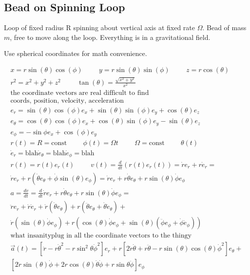 \documentclass[fleqn]{report}
\newcommand{\hp}{\hspace{1cm}}
\newcommand{\equations} [1] {
\begin{gather*}
#1
\end{gather*}
}
\begin{document}
\subsection{Bead on Spinning Loop}
Loop of fixed radius R spinning about vertical axis at fixed rate 
$\Omega$. Bead of mass $m$, free to move along the loop. Everything 
is in a gravitational field. 

Use spherical coordinates for math convenience. 

\equations{
    x = r\sin(\theta) \cos(\phi)
    \hp
    y = r\sin(\theta) \sin(\phi)
    \hp 
    z = r \cos(\theta)
    \\
    r^2 = x^2 + y^2 + z^2
    \hp 
    \tan(\theta) = \frac{\sqrt{x^2 + y^2}}{x^2}
    \\
    \textrm{the coordinate vectors are real difficult to find}
    \\
    \textrm{coords, position, velocity, acceleration}
    \\
    e_r = \sin(\theta) \cos(\phi) e_x + 
    \sin(\theta) \sin(\phi) e_y + 
    \cos(\theta) e_z
    \\
    e_\theta = \cos(\theta) \cos(\phi) e_x + 
    \cos(\theta) \sin(\phi) e_y -
    \sin(\theta) e_z
    \\
    e_\phi = - \sin \phi e_x + \cos(\phi) e_y
    \\
    r(t) = R = \textrm{const}
    \hp \phi(t) = \Omega t \hp \Omega = \textrm{const}
    \hp
    \theta(t)
    \\
    \dot e_r = \textrm{blah}
    \dot e_\theta = \textrm{blah}
    \dot e_\phi = \textrm{blah}
    \\
    r(t) = r(t) e_r(t)
    \hp v(t) = \frac{d}{dt} \left( r(t) e_r(t) \right)
    =
    \dot r e_r + r \dot e_r 
    =
    \\
    \dot r e_r + r \left( 
    \dot \theta e_\theta + \dot \phi \sin(\theta) e_\phi
    \right)
    =
    \dot r e_r + r \dot \theta e_\theta + 
    r \sin(\theta) \dot \phi e_\phi
    \\
    a = \frac{dv}{dt} = \frac{d}{dt}
    \dot r e_r + r \dot \theta e_\theta + 
    r \sin(\theta) \dot \phi e_\phi
    =
    \\
    \ddot r e_r + \dot r \dot e_r + 
    \dot r (\dot \theta e_\theta) + r(\ddot \theta e_\theta + 
    \dot \theta \dot e_\theta) + \\
    \dot r (\sin(\theta) \dot \phi e_\phi) +
    r (
        \cos(\theta) \dot \phi e_\phi + 
        \sin(\theta)(\ddot \phi e_\phi + \dot \phi \dot e_\phi)
    )
    \\
    \textrm{what insanity}
    \textrm{plug in all the coordinate vectors to the thingy}
    \\
    \vec a(t) = 
    [\ddot r - r \dot \theta^2 - 
    r \sin^2 \theta \dot \phi^2] e_r 
    +
    r[2 \dot r \dot \theta + r \ddot \theta  - 
    r \sin(\theta) \cos(\theta) \dot \phi^2] e_\theta 
    + \\
    [2\dot r \sin(\theta) \dot \phi + 
    2 r \cos(\theta) \dot \theta \dot \phi +
    r \sin \theta \ddot \phi] e_\phi
}
\end{document}
